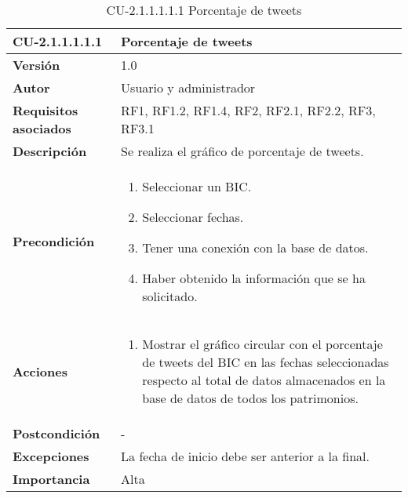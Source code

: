 \begin{table}[h!]
	\centering
	\begin{tabularx}{\linewidth}{ p{} p{} }
		\toprule
		\textbf{CU-2.1.1.1.1.1}    & \textbf{Porcentaje de tweets}\\
		\toprule
		\textbf{Versión}              & 1.0    \\
		\textbf{Autor}                & Usuario y administrador \\
		\textbf{Requisitos asociados} & RF1, RF1.2, RF1.4, RF2, RF2.1, RF2.2, RF3, RF3.1\\
		\textbf{Descripción}          & Se realiza el gráfico de porcentaje de tweets.  \\
        \textbf{Precondición}         & 
        \begin{enumerate}
			\def\labelenumi{\arabic{enumi}.}
			\tightlist
                \item Seleccionar un BIC.
                \item Seleccionar fechas. 
			\item Tener una conexión con la base de datos.
                \item Haber obtenido la información que se ha solicitado.
            
		\end{enumerate}\\
		
		\textbf{Acciones}             &
		\begin{enumerate}
			\def\labelenumi{\arabic{enumi}.}
			\tightlist
			\item Mostrar el gráfico circular con el porcentaje de tweets del BIC en las fechas seleccionadas respecto al total de datos almacenados en la base de datos de todos los patrimonios.
            
		\end{enumerate}\\
		\textbf{Postcondición}        &  - \\
		\textbf{Excepciones}          &  La fecha de inicio debe ser anterior a la final.\\
		\textbf{Importancia}          & Alta \\
		\bottomrule
	\end{tabularx}
	\caption{CU-2.1.1.1.1.1 Porcentaje de tweets}
\end{table}

